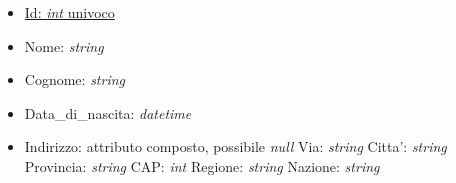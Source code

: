 \documentclass[10pt]{article}
\begin{document}
\begin{itemize}
		\begin{itemize}
			\item \underline{Id: \textit{int} univoco}
			\item Nome: \textit{string}
			\item Cognome: \textit{string}
			\item Data\_di\_nascita: \textit{datetime}			
			\item Indirizzo: attributo composto, possibile \textit{null}
				\subitem Via: \textit{string}
				\subitem Citta': \textit{string}
				\subitem Provincia: \textit{string}
				\subitem CAP: \textit{int}
				\subitem Regione: \textit{string}
				\subitem Nazione: \textit{string}
		\end{itemize}
	\end{itemize}
	
\end{document}
